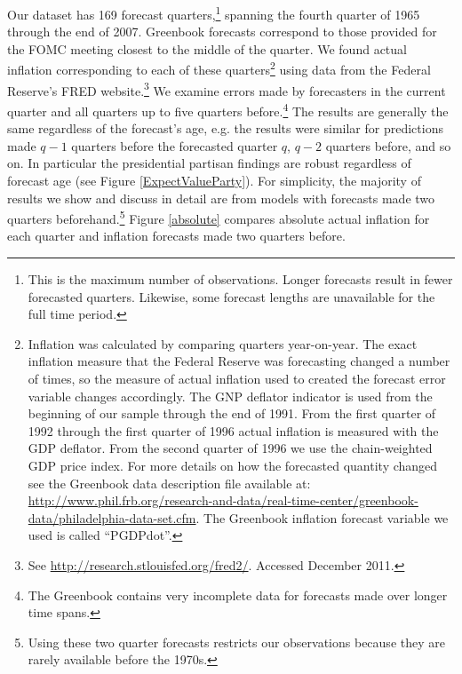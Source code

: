 \documentclass[a4paper]{article}
\begin{document}
Our dataset has 169 forecast quarters,\footnote{This is the maximum number of observations. Longer forecasts result in fewer forecasted quarters. Likewise, some forecast lengths are unavailable for the full time period.} spanning the fourth quarter of 1965 through the end of 2007. Greenbook forecasts correspond to those provided for the FOMC meeting closest to the middle of the quarter. We found actual inflation corresponding to each of these quarters\footnote{Inflation was calculated by comparing quarters year-on-year. The exact inflation measure that the Federal Reserve was forecasting changed a number of times, so the measure of actual inflation used to created the forecast error variable changes accordingly. The GNP deflator indicator is used from the beginning of our sample through the end of 1991. From the first quarter of 1992 through the first quarter of 1996 actual inflation is measured with the GDP deflator. From the second quarter of 1996 we use the chain-weighted GDP price index. For more details on how the forecasted quantity changed see the Greenbook data description file available at: \url{http://www.phil.frb.org/research-and-data/real-time-center/greenbook-data/philadelphia-data-set.cfm}. The Greenbook inflation forecast variable we used is called ``PGDPdot''.} using data from the Federal Reserve's FRED website.\footnote{See \url{http://research.stlouisfed.org/fred2/}. Accessed December 2011.} We examine errors made by forecasters in the current quarter and all quarters up to five quarters before.\footnote{The Greenbook contains very incomplete data for forecasts made over longer time spans.} The results are generally the same regardless of the forecast's age, e.g. the results were similar for predictions made $q - 1$ quarters before the forecasted quarter $q$, $q - 2$ quarters before, and so on. In particular the presidential partisan findings are robust regardless of forecast age (see Figure \ref{ExpectValueParty}). For simplicity, the majority of results we show and discuss in detail are from models with forecasts made two quarters beforehand.\footnote{Using these two quarter forecasts restricts our observations because they are rarely available before the 1970s.} Figure \ref{absolute} compares absolute actual inflation for each quarter and inflation forecasts made two quarters before.
\end{document}
